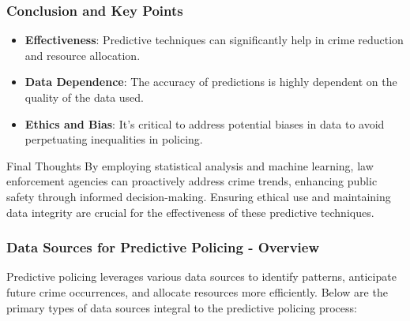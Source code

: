 \documentclass[aspectratio=169]{beamer}
\begin{document}
\begin{frame}
    \frametitle{Conclusion and Key Points}
    \begin{itemize}
        \item \textbf{Effectiveness}: Predictive techniques can significantly help in crime reduction and resource allocation.
        \item \textbf{Data Dependence}: The accuracy of predictions is highly dependent on the quality of the data used.
        \item \textbf{Ethics and Bias}: It’s critical to address potential biases in data to avoid perpetuating inequalities in policing.
    \end{itemize}
    
    \begin{block}{Final Thoughts}
        By employing statistical analysis and machine learning, law enforcement agencies can proactively address crime trends, enhancing public safety through informed decision-making.
        Ensuring ethical use and maintaining data integrity are crucial for the effectiveness of these predictive techniques.
    \end{block}
\end{frame}

\begin{frame}[fragile]
    \frametitle{Data Sources for Predictive Policing - Overview}
    Predictive policing leverages various data sources to identify patterns, anticipate future crime occurrences, and allocate resources more efficiently. Below are the primary types of data sources integral to the predictive policing process:
\end{frame}
\end{document}
